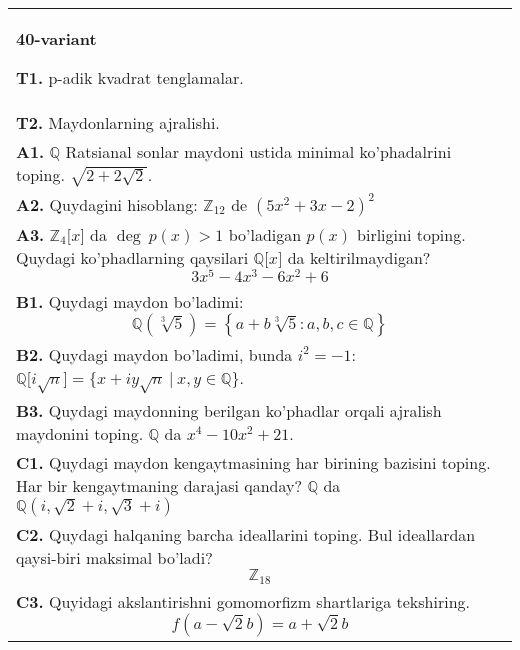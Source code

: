 \documentclass{article}
\begin{document}
\begin{tabular}{m{17cm}}
\textbf{40-variant}
\newline

\textbf{T1.} p-adik kvadrat tenglamalar. \\
\textbf{T2.} Maydonlarning ajralishi. \\
\textbf{A1.} \(\mathbb{Q}\) Ratsianal sonlar maydoni ustida minimal ko'phadalrini toping.
\(\sqrt{2 + 2\sqrt{2}}\). \\
\textbf{A2.} Quydagini hisoblang:
\(\mathbb{Z}_{12}\) de \(\left( 5x^{2} + 3x - 2 \right)^{2}\) \\
\textbf{A3.} \(\mathbb{Z}_{4}\lbrack x\rbrack\) da \(\deg\ p(x) > 1\) bo'ladigan \(p(x)\) birligini toping. Quydagi ko'phadlarning qaysilari \(\mathbb{Q\lbrack}x\rbrack\) da keltirilmaydigan?
\[3x^{5} - 4x^{3} - 6x^{2} + 6\] \\
\textbf{B1.} Quydagi maydon bo'ladimi:
\[\mathbb{Q}\left( \sqrt[3]{5} \right) = \left\{ a + b\sqrt[3]{5}:a,b,c \in \mathbb{Q} \right\}\] \\
\textbf{B2.} Quydagi maydon bo'ladimi, bunda \(i^{2} = - 1\):
\(\mathbb{Q\lbrack}i\sqrt{n}\rbrack = \{ x + iy\sqrt{n}\ |\ x,y \in \mathbb{Q\}}\). \\
\textbf{B3.} Quydagi maydonning berilgan ko'phadlar orqali ajralish maydonini toping.
\(\mathbb{Q}\) da \(x^{4} - 10x^{2} + 21\). \\
\textbf{C1.} Quydagi maydon kengaytmasining har birining bazisini toping. Har bir kengaytmaning darajasi qanday?
\(\mathbb{Q}\) da \(\mathbb{Q}\left( i,\sqrt{2} + i,\sqrt{3} + i \right)\) \\
\textbf{C2.} Quydagi halqaning barcha ideallarini toping. Bul ideallardan qaysi-biri maksimal bo'ladi?
\[\mathbb{Z}_{18}\] \\
\textbf{C3.} Quyidagi akslantirishni gomomorfizm shartlariga tekshiring.
\[f\left( a - \sqrt{2}b \right) = a + \sqrt{2}b\] \\

\end{tabular}
\vspace{1cm}
\end{document}
